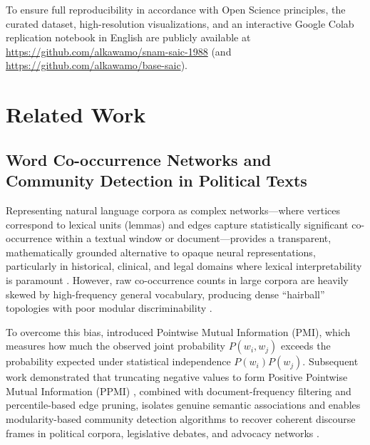 \documentclass[pdflatex,sn-basic]{sn-jnl}
\begin{document}
To ensure full reproducibility in accordance with Open Science principles, the curated dataset, high-resolution visualizations, and an interactive Google Colab replication notebook in English are publicly available at \url{https://github.com/alkawamo/snam-saic-1988} (and \url{https://github.com/alkawamo/base-saic}).

\section{Related Work}\label{sec2}
\subsection{Word Co-occurrence Networks and Community Detection in Political Texts}
Representing natural language corpora as complex networks---where vertices correspond to lexical units (lemmas) and edges capture statistically significant co-occurrence within a textual window or document---provides a transparent, mathematically grounded alternative to opaque neural representations, particularly in historical, clinical, and legal domains where lexical interpretability is paramount \citep{mota2012speech,amancio2015complex,quispe2021using,amancio2025leveraging}. However, raw co-occurrence counts in large corpora are heavily skewed by high-frequency general vocabulary, producing dense ``hairball'' topologies with poor modular discriminability \citep{turney2010frequency,quispe2021using}.

To overcome this bias, \citet{church1990word} introduced Pointwise Mutual Information (PMI), which measures how much the observed joint probability $P(w_i, w_j)$ exceeds the probability expected under statistical independence $P(w_i)P(w_j)$. Subsequent work demonstrated that truncating negative values to form Positive Pointwise Mutual Information (PPMI) \citep{bullinaria2007extracting,turney2010frequency}, combined with document-frequency filtering and percentile-based edge pruning, isolates genuine semantic associations and enables modularity-based community detection algorithms \citep{newman2006modularity,blondel2008fast,fortunato2010community,cordeiro2016dynamic,traag2019louvain} to recover coherent discourse frames in political corpora, legislative debates, and advocacy networks \citep{grimmer2013text,stieglitz2013social,rule2015lexical,bail2016combining}.
\end{document}
